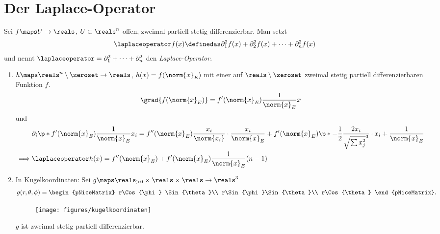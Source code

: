 \section{Der Laplace-Operator}
Sei \( f\maps U\to \reals \), \( U\subset \reals^n \) offen, zweimal partiell stetig differenzierbar. Man setzt
\begin{equation*}
  \laplaceoperator f(x)\definedas \partial_1^2 f(x)+\partial_2^2 f(x)+\dotsb+\partial_n^2 f(x)
\end{equation*}
und nennt \( \laplaceoperator=\partial_1^2+\dotsb+\partial_n^2 \) den \emph{Laplace-Operator}.
\begin{beispiele*}
  \begin{enumerate}
    \item \( h\maps \reals^n\setminus\zeroset\to \reals \), \( h(x)=f(\norm{x}_E) \) mit einer auf \( \reals\setminus \zeroset \) zweimal stetig partiell differenzierbaren Funktion \( f \).
    \begin{equation*}
      \grad{f(\norm{x}_E)}=f'(\norm{x}_E)\frac{1}{\norm{x}_E}x
    \end{equation*}
    und
    \begin{align*}
      &\partial_i\p*{f'(\norm{x}_E)\frac{1}{\norm{x}_E}x_i }=f''(\norm{x}_E)\frac{x_i}{\norm{x_i}}\cdot\frac{x_i}{\norm{x}_E}+f'(\norm{x}_E)\p*{ -\frac{1}{2}\frac{2x_i}{\sqrt{\sum x_j^2}^3}\cdot x_i +\frac{1}{\norm{x}_E} }\\
      \implies &\laplaceoperator h(x)=f''(\norm{x}_E)+f'(\norm{x}_E)\frac{1}{\norm{x}_E}(n-1)
    \end{align*}
    \item In Kugelkoordinaten: Sei \( g\maps \reals_{>0}\times \reals\times\reals\to \reals^3 \)
    \begin{equation*}
      g(r,\theta,\phi)=\begin{pNiceMatrix} r\Cos{\phi} \Sin{\theta}\\ r\Sin{\phi}\Sin{\theta}\\ r\Cos{\theta} \end{pNiceMatrix}.
    \end{equation*}
    \begin{figure}[H]
      \centering
      \texttt{[image: figures/kugelkoordinaten]}
      \label{fig:kugelkoordinaten}
    \end{figure}
    \( g \) ist zweimal stetig partiell differenzierbar.


\end{enumerate}
\end{beispiele*}
